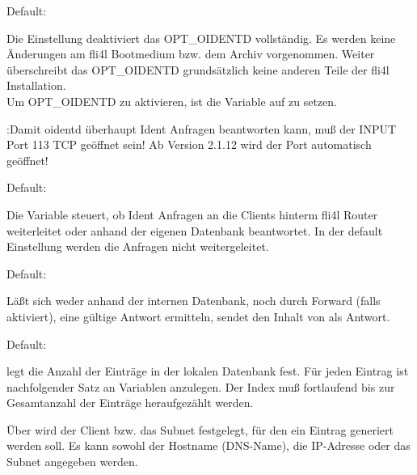 \begin{description}


  Default: 

  Die Einstellung  deaktiviert das OPT\_OIDENTD vollständig. Es werden
  keine Änderungen am fli4l Bootmedium bzw. dem Archiv 
  vorgenommen. Weiter überschreibt das OPT\_OIDENTD grundsätzlich keine anderen
  Teile der fli4l Installation.\\
  Um OPT\_OIDENTD zu aktivieren, ist die Variable  auf 
   zu setzen. 

  \wichtig:{Damit oidentd überhaupt Ident Anfragen beantworten kann, muß
  der INPUT Port 113 TCP geöffnet sein! Ab Version 2.1.12 wird der Port
  automatisch geöffnet!}
  

  Default: 

  Die Variable  steuert, ob  Ident Anfragen
  an die Clients hinterm fli4l Router weiterleitet oder anhand der eigenen
  Datenbank beantwortet. In der default Einstellung werden die Anfragen nicht
  weitergeleitet.


  Default: 

  Läßt sich weder anhand der internen Datenbank, noch durch Forward (falls
  aktiviert), eine gültige Antwort ermitteln, sendet  den Inhalt
  von  als Antwort.


  Default: 

   legt die Anzahl der Einträge in der lokalen
  Datenbank fest. Für jeden Eintrag ist nachfolgender Satz an 
   Variablen anzulegen. Der Index  muß
  fortlaufend bis zur Gesamtanzahl der Einträge heraufgezählt werden. 
  


  Über  wird der Client bzw. das Subnet festgelegt,
  für den ein Eintrag generiert werden soll. Es kann sowohl der Hostname
  (DNS-Name), die IP-Adresse oder das Subnet angegeben werden.


\end{description}
